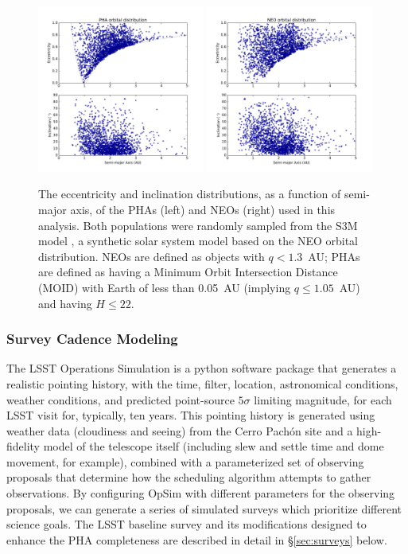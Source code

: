 \begin{figure}[t!]
\centering
\includegraphics[width=0.49\textwidth]{figures/phas_2k_orbits}
\includegraphics[width=0.49\textwidth]{figures/neos_2k_orbits}
\vskip -0.2in
\caption{The eccentricity and inclination distributions, as a function of semi-major axis, of the PHAs (left) and NEOs (right) used in this analysis. Both populations were randomly sampled from the S3M model \citep{Grav2011}, a synthetic solar system model based on the \cite{Bottke2002} NEO orbital distribution. NEOs are defined as objects with $q<1.3$~AU; PHAs are defined as having a Minimum Orbit Intersection Distance (MOID) with Earth of less than 0.05~AU (implying $q\le1.05$~AU) and having $H\le22$.  \label{fig:PHA_orbits}}
\end{figure}

\subsubsection{Survey Cadence Modeling}

The LSST Operations Simulation \citep[OpSim,][]{delgado14} is a python software package that generates a realistic pointing history, with the time, filter, location, astronomical conditions, weather conditions, and predicted point-source $5\sigma$ limiting magnitude, for each LSST visit
for, typically, ten years. This pointing history is generated using weather data (cloudiness and seeing) from the Cerro Pach\'{o}n site and a high-fidelity model of the telescope itself (including slew and settle time and dome movement, for example), combined with a parameterized set of observing proposals that determine how the scheduling algorithm attempts to gather observations. By configuring OpSim with different parameters for the observing proposals, we can generate a series of simulated surveys which prioritize different science goals. The LSST baseline survey and its modifications designed to enhance the PHA completeness are described in detail
in \S\ref{sec:surveys} below.


